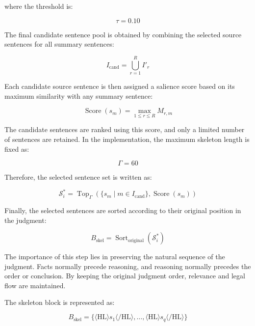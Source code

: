 \documentclass[11pt, a4paper]{article}
\theoremstyle{plain}%
\theoremstyle{remark}%
\theoremstyle{definition}%
\begin{document}
where the threshold is:

\begin{equation}
\tau=0.10
\end{equation}

The final candidate sentence pool is obtained by combining the selected source sentences for all summary sentences:

\begin{equation}
I_{\text{cand}}=\bigcup_{r=1}^{R} I'_r
\end{equation}

Each candidate source sentence is then assigned a salience score based on its maximum similarity with any summary sentence:

\begin{equation}
\operatorname{Score}(s_m)=\max_{1\leq r\leq R} M_{r,m}
\end{equation}

The candidate sentences are ranked using this score, and only a limited number of sentences are retained. In the implementation, the maximum skeleton length is fixed as:

\begin{equation}
\Gamma=60
\end{equation}

Therefore, the selected sentence set is written as:

\begin{equation}
\mathcal{S}_i^{*}
=
\operatorname{Top}_{\Gamma}
\left(
\{s_m \mid m\in I_{\text{cand}}\},
\operatorname{Score}(s_m)
\right)
\end{equation}

Finally, the selected sentences are sorted according to their original position in the judgment:

\begin{equation}
B_{\text{skel}}=\operatorname{Sort}_{\text{original}}(\mathcal{S}_i^{*})
\end{equation}

The importance of this step lies in preserving the natural sequence of the judgment. Facts normally precede reasoning, and reasoning normally precedes the order or conclusion. By keeping the original judgment order, relevance and legal flow are maintained.

The skeleton block is represented as:

\begin{equation}
B_{\text{skel}} =
\{
\langle \mathrm{HL} \rangle s_1 \langle /\mathrm{HL} \rangle,
\ldots,
\langle \mathrm{HL} \rangle s_q \langle /\mathrm{HL} \rangle
\}
\end{equation}
\end{document}
